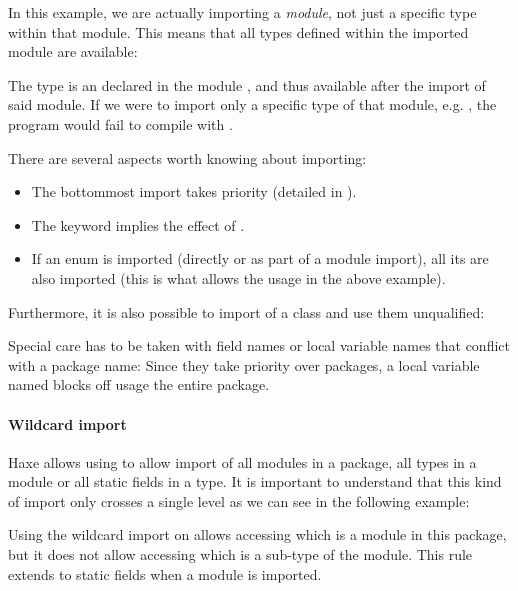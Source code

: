 In this example, we are actually importing a \emph{module}, not just a specific type within that module. This means that all types defined within the imported module are available:


The type  is an  declared in the module , and thus available after the import of said module. If we were to import only a specific type of that module, e.g. , the program would fail to compile with .

There are several aspects worth knowing about importing:

\begin{itemize}
	\item The bottommost import takes priority (detailed in ).
	\item The  keyword  implies the effect of .
	\item If an enum is imported (directly or as part of a module import), all its  are also imported (this is what allows the  usage in the above example).
\end{itemize}

Furthermore, it is also possible to import  of a class and use them unqualified:


Special care has to be taken with field names or local variable names that conflict with a package name: Since they take priority over packages, a local variable named  blocks off usage the entire  package.

\paragraph{Wildcard import}

Haxe allows using  to allow import of all modules in a package, all types in a module or all static fields in a type. It is important to understand that this kind of import only crosses a single level as we can see in the following example:


Using the wildcard import on  allows accessing  which is a module in this package, but it does not allow accessing  which is a sub-type of the  module. This rule extends to static fields when a module is imported.

